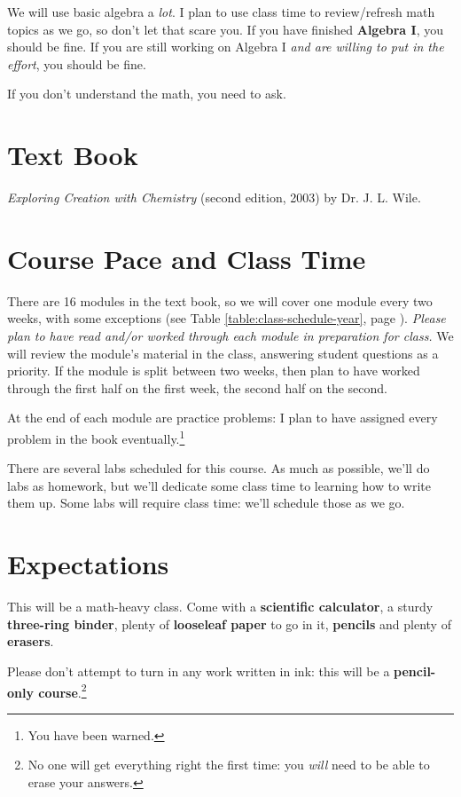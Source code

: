 \documentclass[11pt, oneside]{article}   	%
\begin{document}
We will use basic algebra a \emph{lot}. 
I plan to use class time to review/refresh math topics as we go, so don't let that scare you.
If you have finished \textbf{Algebra I}, you should be fine. 
If you are still working on Algebra I \emph{and are willing to put in the effort}, you should be fine.

If you don't understand the math, you need to ask.

\section{Text Book}
 \emph{Exploring Creation with Chemistry} (second edition, 2003) by Dr. J. L. Wile.

\section{Course Pace and Class Time}
There are 16 modules in the text book, so we will cover one module every two weeks, with some exceptions (see Table \ref{table:class-schedule-year}, page \pageref{table:class-schedule-year}). 
\emph{Please plan to have read and/or worked through each module in preparation for class.}  
We will review the module's material in the class, answering student questions as a priority. 
If the module is split between two weeks, then plan to have worked through the first half on the first week, the second half on the second. 

At the end of each module are practice problems: I plan to have assigned every problem in the book eventually.\footnote{You have been warned.}

There are several labs scheduled for this course. As much as possible, we'll do labs as homework, but we'll dedicate some class time to learning how to write them up.
Some labs will require class time: we'll schedule those as we go.

\section{Expectations}
This will be a math-heavy class. 
Come with a \textbf{scientific calculator}, a sturdy \textbf{three-ring binder}, plenty of \textbf{looseleaf paper} to go in it, \textbf{pencils} and plenty of \textbf{erasers}.

Please don't attempt to turn in any work written in ink: this will be a \textbf{pencil-only course}.\footnote{No one will get everything right the first time: you \emph{will} need to be able to erase your answers.}
\end{document}
